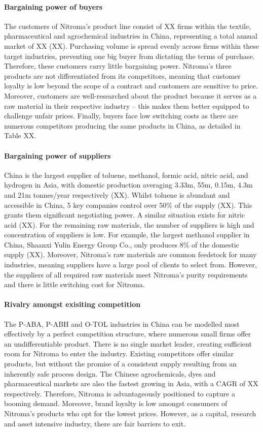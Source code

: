 \paragraph{Bargaining power of buyers}
The customers of Nitroma’s product line consist of XX firms within the textile, pharmaceutical and agrochemical industries in China, representing a total annual market of XX (XX). Purchasing volume is spread evenly across firms within these target industries, preventing one big buyer from dictating the terms of purchase. Therefore, these customers carry little bargaining power. Nitroma’s three products are not differentiated from its competitors, meaning that customer loyalty is low beyond the scope of a contract and customers are sensitive to price. Moreover, customers are well-researched about the product because it serves as a raw material in their respective industry – this makes them better equipped to challenge unfair prices. Finally, buyers face low switching costs as there are numerous competitors producing the same products in China, as detailed in Table XX.

\paragraph{Bargaining power of suppliers}
China is the largest supplier of toluene, methanol, formic acid, nitric acid, and hydrogen in Asia, with domestic production averaging 3.33m, 55m, 0.15m, 4.3m and 21m tonnes/year respectively (XX). Whilst toluene is abundant and accessible in China, 5 key companies control over 50\% of the supply (XX). This grants them significant negotiating power. A similar situation exists for nitric acid (XX). For the remaining raw materials, the number of suppliers is high and concentration of suppliers is low. For example, the largest methanol supplier in China, Shaanxi Yulin Energy Group Co., only produces 8\% of the domestic supply (XX). Moreover, Nitroma’s raw materials are common feedstock for many industries, meaning suppliers have a large pool of clients to select from. However, the suppliers of all required raw materials meet Nitroma’s purity requirements and there is little switching cost for Nitroma. 

\paragraph{Rivalry amongst exisiting competition}
The P-ABA, P-ABH and O-TOL industries in China can be modelled most effectively by a perfect competition structure, where numerous small firms offer an undifferentiable product. There is no single market leader, creating sufficient room for Nitroma to enter the industry. Existing competitors offer similar products, but without the promise of a consistent supply resulting from an inherently safe process design. The Chinese agrochemicals, dyes and pharmaceutical markets are also the fastest growing in Asia, with a CAGR of XX respectively. Therefore, Nitroma is advantageously positioned to capture a booming demand. Moreover, brand loyalty is low amongst consumers of Nitroma’s products who opt for the lowest prices. However, as a capital, research and asset intensive industry, there are fair barriers to exit. 

